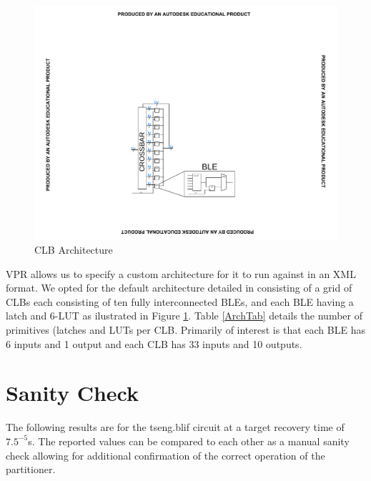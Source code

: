 \documentclass[12pt,final,oneside]{dwThesis} %
\begin{document}
\begin{figure}
\begin{center}
         \includegraphics[clip,trim=8cm 4cm 8cm 8cm]{images/CLB.pdf}
         \caption{\gls{CLB} Architecture} \label{ArchFig} \end{center}
   \end{figure} \gls{VPR} allows us to specify a custom architecture for it to
   run against in an XML format. We opted for the default architecture detailed
   in \cite{VPRManual} consisting of a grid of \glspl{CLB} each consisting of
   ten fully interconnected \glspl{BLE}, and each \gls{BLE} having a latch and
   6-\gls{LUT} as ilustrated in Figure \ref{ArchFig}.  Table \ref{ArchTab}
   details the number of primitives (latches and \glspl{LUT} per \gls{CLB}.
   Primarily of interest is that each \gls{BLE} has 6 inputs and 1 output and
   each \gls{CLB} has 33 inputs and 10 outputs.  




   \section{Sanity Check}\label{resSanity} The following results are for the
   tseng.blif circuit at a target recovery time of $7.5^{-5}$s. The reported
   values can be compared to each other as a manual sanity check allowing for
   additional confirmation of the correct operation of the partitioner.
   
\end{document}
